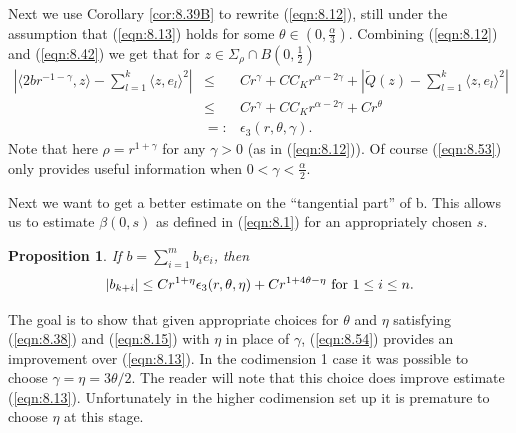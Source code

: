 \documentclass[12pt,leqno]{article}
\theoremstyle{plain}
\newtheorem{prop}[thm]{Proposition}
{\theorembodyfont{\rmfamily}
\newtheorem{defn}[thm]{Definition}}
{\theorembodyfont{\rmfamily}
\newtheorem{rem}[thm]{Remark}}
\numberwithin{equation}{section}
\begin{document}
Next we use Corollary \ref{cor:8.39B} to rewrite (\ref{eqn:8.12}), still under
the assumption that (\ref{eqn:8.13}) holds for some $\theta\in (0,
\frac{\alpha}{3})$. Combining (\ref{eqn:8.12}) and (\ref{eqn:8.42}) we get
that for $z\in \Sigma_\rho\cap B(0, \frac{1}{2})$
\begin{eqnarray}\label{eqn:8.53}
|\langle 2br^{-1-\gamma}, z\rangle-
\sum_{l=1}^k\langle z,e_l\rangle^2|
 & \le &
Cr^\gamma + CC_Kr^{\alpha-2\gamma}+ |\widetilde Q(z)-
\sum_{l=1}^k\langle z,e_l\rangle^2| \\
& \le & Cr^\gamma+CC_Kr^{\alpha-2\gamma} + Cr^\theta \nonumber\\
& =: & \epsilon_3(r,\theta,\gamma).\nonumber
\end{eqnarray}
Note that here $\rho=r^{1+\gamma}$ for any $\gamma>0$ (as in
(\ref{eqn:8.12})). Of course (\ref{eqn:8.53}) only provides useful
information when $0<\gamma<\frac{\alpha}{2}$.



Next we want to get a better estimate on the ``tangential part'' of b.
This allows us to estimate $\beta(0,s)$ as defined in (\ref{eqn:8.1})
for an appropriately chosen $s$.

\begin{prop}\label{prop:8.100}
If $b=\mathop{\sum}\limits^{m}_{i=1} b_ie_i$, then
\begin{equation}\label{eqn:8.54}
|b_{k+i}|\le C r^{1+\eta}\epsilon_3(r,\theta,\eta) + Cr^{1+4\theta-\eta}
\hbox{ for }1\le i\le n.
\end{equation}
\end{prop}

\begin{rem} The goal is to show that given appropriate choices
for $\theta$ and $\eta$ satisfying
(\ref{eqn:8.38}) and (\ref{eqn:8.15}) with $\eta$ in place of $\gamma$,
(\ref{eqn:8.54}) provides an improvement over (\ref{eqn:8.13}).
In the codimension 1 case it was possible to choose $\gamma=\eta=3\theta/2$.
The reader will note that this choice does improve estimate
(\ref{eqn:8.13}). Unfortunately in the higher codimension set up it is
premature to choose $\eta$ at this stage.

\end{rem}
\end{document}
